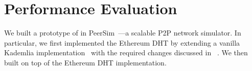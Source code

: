 
\section{Performance Evaluation}
\label{sec:eval}



We built a prototype of \sysname in PeerSim~\cite{p2p09-peersim}---a scalable P2P network simulator. In particular, we first implemented the Ethereum DHT by extending a vanilla Kademlia implementation~\cite{peersim_kademlia} with the required changes discussed in ~. We then built \sysname on top of the Ethereum DHT implementation.

